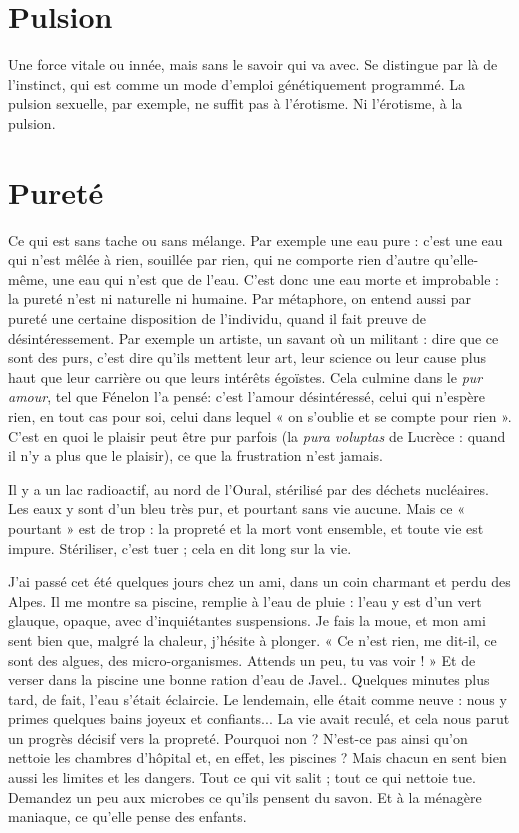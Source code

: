 \section{Pulsion}
Une force vitale ou innée, mais sans le savoir qui va avec. Se distingue
par là de l'instinct, qui est comme un mode d'emploi
génétiquement programmé. La pulsion sexuelle, par exemple, ne suffit pas à
l'érotisme. Ni l'érotisme, à la pulsion.

\section{Pureté}
Ce qui est sans tache ou sans mélange. Par exemple une eau
pure : c’est une eau qui n’est mêlée à rien, souillée par rien, qui
ne comporte rien d’autre qu’elle-même, une eau qui n’est que de l’eau. C’est
donc une eau morte et improbable : la pureté n’est ni naturelle ni humaine.
Par métaphore, on entend aussi par pureté une certaine disposition de
l'individu, quand il fait preuve de désintéressement. Par exemple un artiste, un
savant où un militant : dire que ce sont des purs, c’est dire qu’ils mettent leur
art, leur science ou leur cause plus haut que leur carrière ou que leurs intérêts
égoïstes. Cela culmine dans le {\it pur amour}, tel que Fénelon l’a pensé: c’est
l'amour désintéressé, celui qui n’espère rien, en tout cas pour soi, celui dans
lequel « on s’oublie et se compte pour rien ». C’est en quoi le plaisir peut être
pur parfois (la {\it pura voluptas} de Lucrèce : quand il n’y a plus que le plaisir), ce
que la frustration n’est jamais.

Il y a un lac radioactif, au nord de l’Oural, stérilisé par des déchets
nucléaires. Les eaux y sont d’un bleu très pur, et pourtant sans vie aucune. Mais
ce « pourtant » est de trop : la propreté et la mort vont ensemble, et toute vie
est impure. Stériliser, c’est tuer ; cela en dit long sur la vie.

J'ai passé cet été quelques jours chez un ami, dans un coin charmant et
perdu des Alpes. Il me montre sa piscine, remplie à l’eau de pluie : l’eau y est
d’un vert glauque, opaque, avec d’inquiétantes suspensions. Je fais la moue,
et mon ami sent bien que, malgré la chaleur, j'hésite à plonger. « Ce n’est rien,
me dit-il, ce sont des algues, des micro-organismes. Attends un peu, tu vas
voir ! » Et de verser dans la piscine une bonne ration d’eau de Javel.. Quelques
minutes plus tard, de fait, l’eau s’était éclaircie. Le lendemain, elle était comme
neuve : nous y primes quelques bains joyeux et confiants... La vie avait reculé,
et cela nous parut un progrès décisif vers la propreté. Pourquoi non ? N'est-ce
pas ainsi qu’on nettoie les chambres d’hôpital et, en effet, les piscines ? Mais
chacun en sent bien aussi les limites et les dangers. Tout ce qui vit salit ; tout
ce qui nettoie tue. Demandez un peu aux microbes ce qu’ils pensent du savon.
Et à la ménagère maniaque, ce qu’elle pense des enfants.

